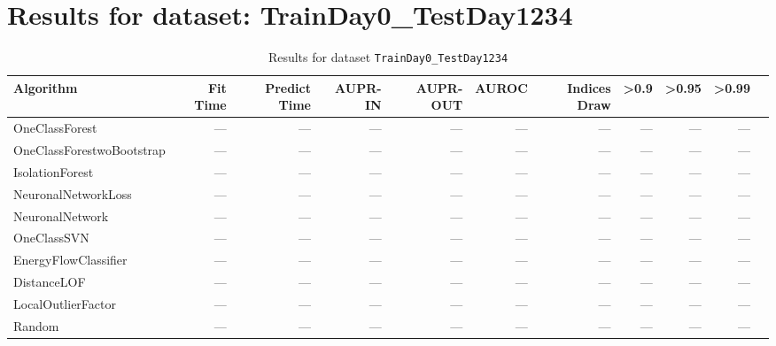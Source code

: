 \documentclass{article}
\begin{document}
\section*{Results for dataset: TrainDay0_TestDay1234}
\begin{table}[h!]
\centering
\caption{Results for dataset \texttt{TrainDay0_TestDay1234}}
\label{tab:trainday0testday1234}
\begin{tabular}{lrrrrrrrrrr}
\toprule
Algorithm & Fit Time & Predict Time & AUPR-IN & AUPR-OUT & AUROC & Indices Draw & >0.9 & >0.95 & >0.99 \\
\midrule
OneClassForest & --- & --- & --- & --- & --- & --- & --- & --- & --- \\
OneClassForestwoBootstrap & --- & --- & --- & --- & --- & --- & --- & --- & --- \\
IsolationForest & --- & --- & --- & --- & --- & --- & --- & --- & --- \\
NeuronalNetworkLoss & --- & --- & --- & --- & --- & --- & --- & --- & --- \\
NeuronalNetwork & --- & --- & --- & --- & --- & --- & --- & --- & --- \\
OneClassSVN & --- & --- & --- & --- & --- & --- & --- & --- & --- \\
EnergyFlowClassifier & --- & --- & --- & --- & --- & --- & --- & --- & --- \\
DistanceLOF & --- & --- & --- & --- & --- & --- & --- & --- & --- \\
LocalOutlierFactor & --- & --- & --- & --- & --- & --- & --- & --- & --- \\
Random & --- & --- & --- & --- & --- & --- & --- & --- & --- \\
\bottomrule
\end{tabular}
\end{table}
\end{document}
